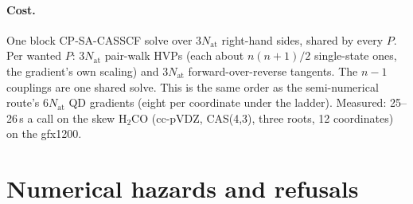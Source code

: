 \documentclass[11pt]{article}
\begin{document}
\paragraph{Cost.} One block CP-SA-CASSCF solve over $3N_{\mathrm{at}}$
right-hand sides, shared by every $P$. Per wanted $P$: $3N_{\mathrm{at}}$
pair-walk HVPs (each about $n(n+1)/2$ single-state ones, the gradient's own
scaling) and $3N_{\mathrm{at}}$ forward-over-reverse tangents. The $n-1$
couplings are one shared solve. This is the same order as the
semi-numerical route's $6N_{\mathrm{at}}$ QD gradients (eight per
coordinate under the ladder). Measured: 25--26\,s a call on the skew
H$_2$CO (cc-pVDZ, CAS(4,3), three roots, 12 coordinates) on the gfx1200.

\section{Numerical hazards and refusals}
\label{sec:hazards}
\end{document}
